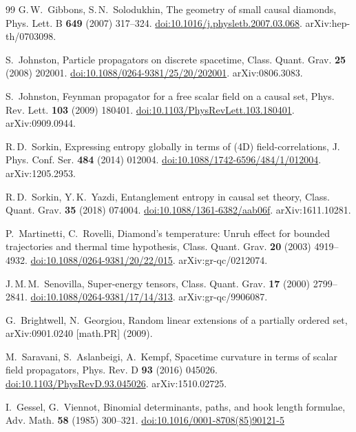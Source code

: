 \documentclass[12pt,a4paper]{article}
\theoremstyle{plain}
\theoremstyle{definition}
\theoremstyle{remark}
\begin{document}
\begin{thebibliography}{99}
G.\,W.~Gibbons, S.\,N.~Solodukhin,
The geometry of small causal diamonds,
Phys. Lett. B \textbf{649} (2007) 317--324.
\href{https://doi.org/10.1016/j.physletb.2007.03.068}{doi:10.1016/j.physletb.2007.03.068}.
arXiv:hep-th/0703098.

S.~Johnston,
Particle propagators on discrete spacetime,
Class. Quant. Grav. \textbf{25} (2008) 202001.
\href{https://doi.org/10.1088/0264-9381/25/20/202001}{doi:10.1088/0264-9381/25/20/202001}.
arXiv:0806.3083.

S.~Johnston,
Feynman propagator for a free scalar field on a causal set,
Phys. Rev. Lett. \textbf{103} (2009) 180401.
\href{https://doi.org/10.1103/PhysRevLett.103.180401}{doi:10.1103/PhysRevLett.103.180401}.
arXiv:0909.0944.

R.\,D.~Sorkin,
Expressing entropy globally in terms of (4D) field-correlations,
J. Phys. Conf. Ser. \textbf{484} (2014) 012004.
\href{https://doi.org/10.1088/1742-6596/484/1/012004}{doi:10.1088/1742-6596/484/1/012004}.
arXiv:1205.2953.

R.\,D.~Sorkin, Y.\,K.~Yazdi,
Entanglement entropy in causal set theory,
Class. Quant. Grav. \textbf{35} (2018) 074004.
\href{https://doi.org/10.1088/1361-6382/aab06f}{doi:10.1088/1361-6382/aab06f}.
arXiv:1611.10281.

P.~Martinetti, C.~Rovelli,
Diamond's temperature: Unruh effect for bounded trajectories and thermal time hypothesis,
Class. Quant. Grav. \textbf{20} (2003) 4919--4932.
\href{https://doi.org/10.1088/0264-9381/20/22/015}{doi:10.1088/0264-9381/20/22/015}.
arXiv:gr-qc/0212074.

J.\,M.\,M.~Senovilla,
Super-energy tensors,
Class. Quant. Grav. \textbf{17} (2000) 2799--2841.
\href{https://doi.org/10.1088/0264-9381/17/14/313}{doi:10.1088/0264-9381/17/14/313}.
arXiv:gr-qc/9906087.

G.~Brightwell, N.~Georgiou,
Random linear extensions of a partially ordered set,
arXiv:0901.0240 [math.PR] (2009).

M.~Saravani, S.~Aslanbeigi, A.~Kempf,
Spacetime curvature in terms of scalar field propagators,
Phys. Rev. D \textbf{93} (2016) 045026.
\href{https://doi.org/10.1103/PhysRevD.93.045026}{doi:10.1103/PhysRevD.93.045026}.
arXiv:1510.02725.

I.~Gessel, G.~Viennot,
Binomial determinants, paths, and hook length formulae,
Adv. Math. \textbf{58} (1985) 300--321.
\href{https://doi.org/10.1016/0001-8708(85)90121-5}{doi:10.1016/0001-8708(85)90121-5}


\end{thebibliography}
\end{document}
